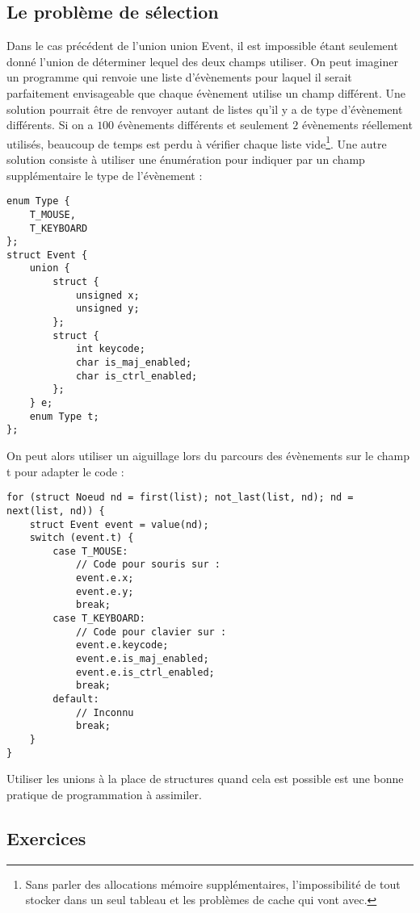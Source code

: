 \documentclass[../../../main.tex]{subfiles}
\begin{document}
\subsection{Le problème de sélection}
Dans le cas précédent de l'union \textsf{union Event}, il est impossible étant seulement donné l'union de déterminer lequel des deux champs utiliser. On peut imaginer un programme qui renvoie une liste d'évènements pour laquel il serait parfaitement envisageable que chaque évènement utilise un champ différent. Une solution pourrait être de renvoyer autant de listes qu'il y a de type d'évènement différents. Si on a $100$ évènements différents et seulement $2$ évènements réellement utilisés, beaucoup de temps est perdu à vérifier chaque liste vide\footnote{Sans parler des allocations mémoire supplémentaires, l'impossibilité de tout stocker dans un seul tableau et les problèmes de cache qui vont avec.}. Une autre solution consiste à utiliser une énumération pour indiquer par un champ supplémentaire le type de l'évènement :
\begin{verbatim}
enum Type {
	T_MOUSE,
	T_KEYBOARD
};
struct Event {
	union {
		struct {
			unsigned x;
			unsigned y;
		};
		struct {
			int keycode;
			char is_maj_enabled;
			char is_ctrl_enabled;
		};
	} e;
	enum Type t;
};
\end{verbatim}
On peut alors utiliser un aiguillage lors du parcours des évènements sur le champ \textsf{t} pour adapter le code :
\begin{verbatim}
for (struct Noeud nd = first(list); not_last(list, nd); nd = next(list, nd)) {
	struct Event event = value(nd);
	switch (event.t) {
		case T_MOUSE:
			// Code pour souris sur :
			event.e.x;
			event.e.y;
			break;
		case T_KEYBOARD:
			// Code pour clavier sur :
			event.e.keycode;
			event.e.is_maj_enabled;
			event.e.is_ctrl_enabled;
			break;
		default:
			// Inconnu
			break;
	}
}
\end{verbatim}
Utiliser les unions à la place de structures quand cela est possible est une bonne pratique de programmation
à assimiler.
\subsection{Exercices}
\end{document}
